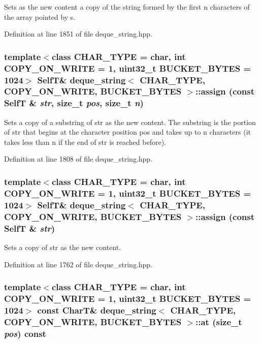 Sets as the new content a copy of the string formed by the first n characters of the array pointed by s. 

Definition at line 1851 of file deque\_\-string.hpp.\hypertarget{classdeque__string_d40c73d6f33a68ca241440ec530096a8}{
\subsubsection[{assign}]{\setlength{\rightskip}{0pt plus 5cm}template$<$class CHAR\_\-TYPE  = char, int COPY\_\-ON\_\-WRITE = 1, uint32\_\-t BUCKET\_\-BYTES = 1024$>$ {\bf SelfT}\& {\bf deque\_\-string}$<$ CHAR\_\-TYPE, COPY\_\-ON\_\-WRITE, BUCKET\_\-BYTES $>$::assign (const {\bf SelfT} \& {\em str}, \/  size\_\-t {\em pos}, \/  size\_\-t {\em n})}}
\label{classdeque__string_d40c73d6f33a68ca241440ec530096a8}


Sets a copy of a substring of str as the new content. The substring is the portion of str that begins at the character position pos and takes up to n characters (it takes less than n if the end of str is reached before). 

Definition at line 1808 of file deque\_\-string.hpp.\hypertarget{classdeque__string_93be2245162d2b65148b106e457e24ae}{
\subsubsection[{assign}]{\setlength{\rightskip}{0pt plus 5cm}template$<$class CHAR\_\-TYPE  = char, int COPY\_\-ON\_\-WRITE = 1, uint32\_\-t BUCKET\_\-BYTES = 1024$>$ {\bf SelfT}\& {\bf deque\_\-string}$<$ CHAR\_\-TYPE, COPY\_\-ON\_\-WRITE, BUCKET\_\-BYTES $>$::assign (const {\bf SelfT} \& {\em str})}}
\label{classdeque__string_93be2245162d2b65148b106e457e24ae}


Sets a copy of str as the new content. 

Definition at line 1762 of file deque\_\-string.hpp.\hypertarget{classdeque__string_54e0631a4ddc10a3213bb32209798f39}{
\subsubsection[{at}]{\setlength{\rightskip}{0pt plus 5cm}template$<$class CHAR\_\-TYPE  = char, int COPY\_\-ON\_\-WRITE = 1, uint32\_\-t BUCKET\_\-BYTES = 1024$>$ const CharT\& {\bf deque\_\-string}$<$ CHAR\_\-TYPE, COPY\_\-ON\_\-WRITE, BUCKET\_\-BYTES $>$::at (size\_\-t {\em pos}) const}}
\label{classdeque__string_54e0631a4ddc10a3213bb32209798f39}


